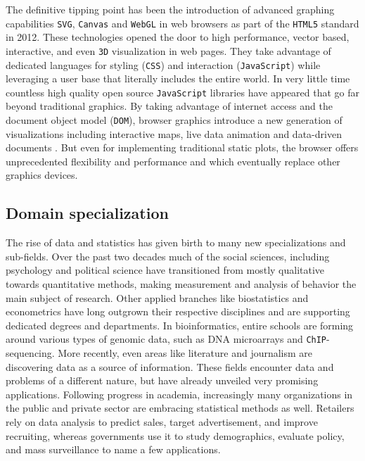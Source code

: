 The definitive tipping point has been the introduction of advanced graphing capabilities \texttt{SVG}, \texttt{Canvas} and \texttt{WebGL} in web browsers as part of the \texttt{HTML5} standard in 2012. These technologies opened the door to high performance, vector based, interactive, and even \texttt{3D} visualization in web pages. They take advantage of dedicated languages for styling (\texttt{CSS}) and interaction (\texttt{JavaScript}) while leveraging a user base that literally includes the entire world. In very little time countless high quality open source \texttt{JavaScript} libraries have appeared that go far beyond traditional graphics. By taking advantage of internet access and the document object model (\texttt{DOM}), browser graphics introduce a new generation of visualizations including interactive maps, live data animation and data-driven documents \citep{bostock2011d3}. But even for implementing traditional static plots, the browser offers unprecedented flexibility and performance and which eventually replace other graphics devices.

\subsection{Domain specialization}

The rise of data and statistics has given birth to many new specializations and sub-fields. Over the past two decades much of the social sciences, including psychology and political science have transitioned from mostly qualitative towards quantitative methods, making measurement and analysis of behavior the main subject of research. Other applied branches like biostatistics and econometrics have long outgrown their respective disciplines and are supporting dedicated degrees and departments. In bioinformatics, entire schools are forming around various types of genomic data, such as DNA microarrays and \texttt{ChIP}-sequencing. More recently, even areas like literature and journalism are discovering data as a source of information. 
These fields encounter data and problems of a different nature, but have already unveiled very promising applications. 
Following progress in academia, increasingly many organizations in the public and private sector are embracing statistical methods as well. Retailers rely on data analysis to predict sales, target advertisement, and improve recruiting, whereas governments use it to study demographics, evaluate policy, and mass surveillance to name a few applications. 

